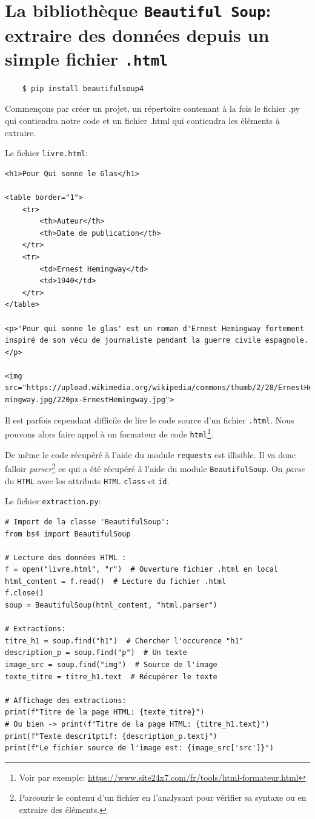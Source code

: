 \documentclass[a4paper,11pt]{book}
\begin{document}
\section{La bibliothèque \texttt{Beautiful Soup}: extraire des données depuis un simple fichier \texttt{.html}}
\begin{verbatim}
    $ pip install beautifulsoup4
\end{verbatim}
\medskip

Commençons par créer un projet, un répertoire contenant à la fois le fichier .py qui contiendra notre code et un fichier .html qui contiendra les éléments à extraire.
\medskip

Le fichier \texttt{livre.html}:
\begin{verbatim}
<h1>Pour Qui sonne le Glas</h1>

<table border="1">
    <tr>
        <th>Auteur</th>
        <th>Date de publication</th>
    </tr>
    <tr>
        <td>Ernest Hemingway</td>
        <td>1940</td>
    </tr>
</table>

<p>'Pour qui sonne le glas' est un roman d'Ernest Hemingway fortement 
inspiré de son vécu de journaliste pendant la guerre civile espagnole. </p>

<img src="https://upload.wikimedia.org/wikipedia/commons/thumb/2/28/ErnestHe
mingway.jpg/220px-ErnestHemingway.jpg">
\end{verbatim}
\medskip

Il est parfois cependant difficile de lire le code source d'un fichier \texttt{.html}. Nous pouvons alors faire appel à un formateur de code \texttt{html}\footnote{Voir par exemple: \url{https://www.site24x7.com/fr/tools/html-formateur.html}}.
\medskip

De même le code récupéré à l'aide du module \texttt{requests} est illisible. Il va donc falloir \textit{parser}\footnote{Parcourir le contenu d'un fichier en l'analysant pour vérifier sa syntaxe ou en extraire des éléments.} ce qui a été récupéré à l'aide du module \texttt{BeautifulSoup}. On \textit{parse} du \texttt{HTML} avec les attributs \texttt{HTML} \texttt{class} et \texttt{id}.
\medskip

Le fichier \texttt{extraction.py}:
\begin{lstlisting}[caption=Exemple simple d'extraction avec \texttt{Beautiful Soup}]
# Import de la classe 'BeautifulSoup':
from bs4 import BeautifulSoup  

# Lecture des données HTML :
f = open("livre.html", "r")  # Ouverture fichier .html en local
html_content = f.read()  # Lecture du fichier .html
f.close()
soup = BeautifulSoup(html_content, "html.parser")

# Extractions:
titre_h1 = soup.find("h1")  # Chercher l'occurence "h1"
description_p = soup.find("p")  # Un texte
image_src = soup.find("img")  # Source de l'image
texte_titre = titre_h1.text  # Récupérer le texte

# Affichage des extractions:
print(f"Titre de la page HTML: {texte_titre}")
# Ou bien -> print(f"Titre de la page HTML: {titre_h1.text}")
print(f"Texte descritptif: {description_p.text}")
print(f"Le fichier source de l'image est: {image_src['src']}")
\end{lstlisting}
\medskip
\end{document}
